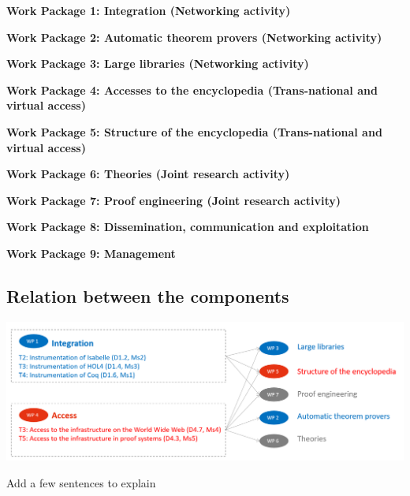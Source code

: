 \begin{workplan}


  \newcommand\na{(Networking activity)}
  \newcommand\tnva{(Trans-national and virtual access)}
  \newcommand\jra{(Joint research activity)}
  \newcommand\titlewp[3]{\bigskip\noindent\colorbox{color3}{\begin{minipage}\textwidth\bf Work Package #1: #2\end{minipage}}}

\titlewp{1}{Integration \na}{instrumentation}

\titlewp{2}{Automatic theorem provers \na}{atpetc}

\titlewp{3}{Large libraries \na}{libraries}

\titlewp{4}{Accesses to the encyclopedia \tnva}{access}

\titlewp{5}{Structure of the encyclopedia \tnva}{structuring}

\titlewp{6}{Theories \jra}{theories}

\titlewp{7}{Proof engineering \jra}{alignment}

\titlewp{8}{Dissemination, communication and exploitation}{dissemination}

\titlewp{9}{Management}{management}

\end{workplan}



\subsection{Relation between the components}

\includegraphics[width=\textwidth]{img/PERT}

{\color{red} Add a few sentences to explain}


